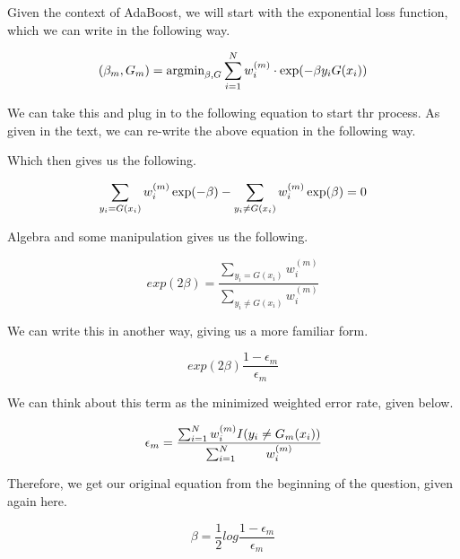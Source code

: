 \documentclass[12pt, letterpaper]{article}
\begin{document}
Given the context of AdaBoost, we will start with the exponential loss function, which we can write in the following way. 

\begin{equation}
(\beta_m, G_m) = \text{argmin}_{\beta, G} \sum_{i=1}^{N} w_i^{(m)} \\ 
\cdot \exp(- \beta y_i G(x_i))
\end{equation}

We can take this and plug in to the following equation to start thr process. As given in the text, we can re-write the above equation in the following way. 

Which then gives us the following. 

\begin{equation}
\sum_{y_i = G(x_i)} w_i^{(m)} \exp(- \beta) - \sum_{y_i \neq G(x_i)} \\
w_i^{(m)} \exp(\beta) = 0
\end{equation}

Algebra and some manipulation gives us the following. 

\begin{equation}
exp(2 \beta) = \frac{\sum_{y_i = G(x_i)} w_i^{(m)}}{\sum_{y_i \neq G(x_i)} w_i^{(m)}}
\end{equation}

We can write this in another way, giving us a more familiar form. 

\begin{equation}
exp(2 \beta) \frac{1 - \epsilon_m}{\epsilon_m}
\end{equation}

We can think about this term as the minimized weighted error rate, given below. 

\begin{equation}
\epsilon_m = \frac{\sum_{i=1}^{N} w_i^{(m)} I(y_i \neq G_m(x_i))}{\sum_{i = 1}^{N} \\
w_i^{(m)}}
\end{equation}

Therefore, we get our original equation from the beginning of the question, given again here. 

\begin{equation}
\beta = \frac{1}{2} log \frac{1 - \epsilon_m}{\epsilon_m}
\end{equation}
\end{document}
